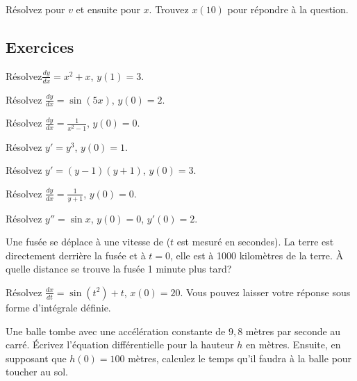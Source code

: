 \begin{exercise}
	Résolvez pour $v$ et ensuite pour $x$.  Trouvez $x(10)$ pour répondre à la question.
\end{exercise}


\subsection{Exercices}

\begin{exercise}
	Résolvez$\frac{dy}{dx} = x^2+x$, $y(1)=3$.
\end{exercise}

\begin{exercise}
	Résolvez $\frac{dy}{dx} = \sin (5x)$, $y(0)=2$.
\end{exercise}

\begin{exercise}
	Résolvez $\frac{dy}{dx} = \frac{1}{x^2-1}$, $y(0)=0$.
\end{exercise}

\begin{exercise}
	Résolvez $y' = y^3$, $y(0)=1$.
\end{exercise}

\begin{exercise}
	Résolvez $y' = (y-1)(y+1)$, $y(0)=3$.
\end{exercise}

\begin{exercise}
	Résolvez $\frac{dy}{dx} = \frac{1}{y+1}$, $y(0)=0$.
\end{exercise}

\begin{exercise}
	Résolvez $y'' = \sin x$, $y(0)=0$, $y'(0) = 2$.
\end{exercise}

\begin{exercise}
	Une fusée se déplace à une vitesse de  ($t$ est mesuré en secondes).
	La terre est directement derrière la fusée et à $t=0$, elle est à 1000 kilomètres de la terre.  À quelle distance se trouve la fusée 1 minute plus tard?
\end{exercise}

\begin{exercise}
	Résolvez $\frac{dx}{dt} = \sin(t^2)+t$, $x(0)=20$.  Vous pouvez laisser votre réponse sous forme d'intégrale définie.
\end{exercise}

\begin{exercise}
	Une balle tombe avec une accélération constante de $9,8$ mètres par seconde au carré.
	Écrivez l'équation différentielle pour la hauteur $h$ en mètres.
	Ensuite, en supposant que $h(0) = 100$ mètres, calculez le temps qu'il faudra à la balle pour toucher au sol.
\end{exercise}

